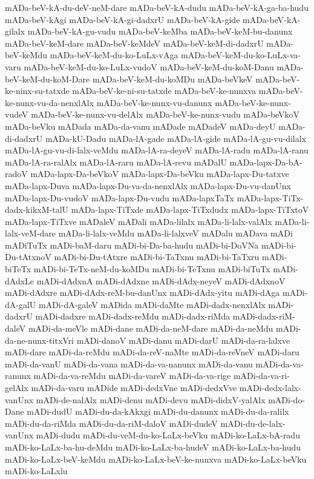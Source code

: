 {mADa-beV-kA-du-deV-neM-dare
mADa-beV-kA-dudu
mADa-beV-kA-ga-ba-hudu
mADa-beV-kAgi
mADa-beV-kA-gi-dadxrU
mADa-beV-kA-gide
mADa-beV-kA-gilalx
mADa-beV-kA-gu-vudu
mADa-beV-keMba
mADa-beV-keM-bu-danunx
mADa-beV-keM-dare
mADa-beV-keMdeV
mADa-beV-keM-di-dadxrU
mADa-beV-keMdu
mADa-beV-keM-du-ko-LuLx-vAga
mADa-beV-keM-du-ko-LuLx-va-varu
mADa-beV-keM-du-ko-LuLx-vudoV
mADa-beV-keM-du-koM-Danu
mADa-beV-keM-du-koM-Dare
mADa-beV-keM-du-koMDu
mADa-beVkeV
mADa-beV-ke-ninx-su-tatxde
mADa-beV-ke-ni-su-tatxde
mADa-beV-ke-nunxva
mADa-beV-ke-nunx-vu-da-nenxlAlx
mADa-beV-ke-nunx-vu-danunx
mADa-beV-ke-nunx-vudeV
mADa-beV-ke-nunx-vu-delAlx
mADa-beV-ke-nunx-vudu
mADa-beVkoV
mADa-beVku
mADada
mADa-da-vanu
mADade
mADadeV
mADa-deyU
mADa-di-dadxrU
mADa-kU-Dadu
mADa-lA-gade
mADa-lA-gide
mADa-lA-gu-vu-dilalx
mADa-lA-gu-vu-di-lalx-veMdu
mADa-lA-ra-deyeV
mADa-lA-radu
mADa-lA-ranu
mADa-lA-ra-ralAlx
mADa-lA-raru
mADa-lA-revu
mADalU
mADa-lapx-Da-bA-radoV
mADa-lapx-Da-beVkoV
mADa-lapx-Da-beVku
mADa-lapx-Du-tatxve
mADa-lapx-Duva
mADa-lapx-Du-va-da-nenxlAlx
mADa-lapx-Du-vu-danUnx
mADa-lapx-Du-vudoV
mADa-lapx-Du-vudu
mADa-lapxTaTx
mADa-lapx-TiTx-dadx-kikxM-talU
mADa-lapx-TiTxde
mADa-lapx-TiTxdudx
mADa-lapx-TiTxtoV
mADa-lapx-TiTxve
mADaleV
mADali
mADa-lilalx
mADa-li-lalx-valAlx
mADa-li-lalx-veM-dare
mADa-li-lalx-veMdu
mADa-li-lalxveV
mADalu
mADava
mADi
mADiTuTx
mADi-baM-daru
mADi-bi-Da-ba-hudu
mADi-bi-DoVNa
mADi-bi-Du-tAtxnoV
mADi-bi-Du-tAtxre
mADi-bi-TaTxnu
mADi-bi-TaTxru
mADi-biTeTx
mADi-bi-TeTx-neM-du-koMDu
mADi-bi-TeTxnu
mADi-biTuTx
mADi-dAdxLe
mADi-dAdxnA
mADi-dAdxne
mADi-dAdx-neyeV
mADi-dAdxnoV
mADi-dAdxre
mADi-dAdx-reM-bu-danUnx
mADi-dAdx-yitu
mADi-dAga
mADi-dA-galU
mADi-dA-galeV
mADida
mADi-daMte
mADi-dadx-nenxlAlx
mADi-dadxrU
mADi-dadxre
mADi-dadx-reMdu
mADi-dadx-riMda
mADi-dadx-riM-daleV
mADi-da-meVle
mADi-dane
mADi-da-neM-dare
mADi-da-neMdu
mADi-da-ne-nunx-titxVri
mADi-danoV
mADi-danu
mADi-darU
mADi-da-ra-lalxve
mADi-dare
mADi-da-reMdu
mADi-da-reV-naMte
mADi-da-reVneV
mADi-daru
mADi-da-vanU
mADi-da-vana
mADi-da-va-nanunx
mADi-da-vanu
mADi-da-va-ranunx
mADi-da-va-reMdu
mADi-da-vareV
mADi-da-va-rige
mADi-da-va-ri-gelAlx
mADi-da-varu
mADide
mADi-dedxVne
mADi-dedxVve
mADi-dedx-lalx-vanUnx
mADi-de-nalAlx
mADi-denu
mADi-devu
mADi-didxV-yalAlx
mADi-do-Dane
mADi-dudU
mADi-du-da-kAkxgi
mADi-du-danunx
mADi-du-da-ralilx
mADi-du-da-riMda
mADi-du-da-riM-daloV
mADi-dudeV
mADi-du-de-lalx-vanUnx
mADi-dudu
mADi-du-veM-du-ko-LaLx-beVku
mADi-ko-LaLx-bA-radu
mADi-ko-LaLx-ba-hu-deMdu
mADi-ko-LaLx-ba-hudeV
mADi-ko-LaLx-ba-hudu
mADi-ko-LaLx-beV-keMdu
mADi-ko-LaLx-beV-ke-nunxva
mADi-ko-LaLx-beVku
mADi-ko-LaLxlu
}
